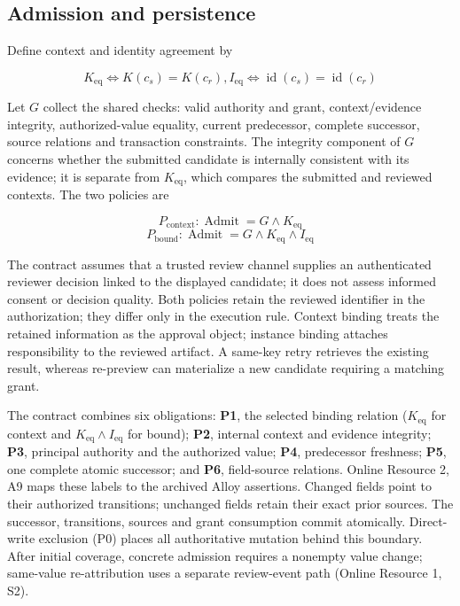 \documentclass[pdflatex,sn-basic]{sn-jnl}
\begin{document}
\subsection{Admission and persistence}\label{admission-and-persistence}

Define context and identity agreement by

\[
K_{\mathrm{eq}} \Leftrightarrow  K(c_s) = K(c_r),   I_{\mathrm{eq}} \Leftrightarrow  \operatorname{id}(c_s) = \operatorname{id}(c_r)
\]

Let \(G\) collect the shared checks: valid authority and grant, context/evidence integrity, authorized-value equality, current predecessor, complete successor, source relations and transaction constraints. The integrity component of \(G\) concerns whether the submitted candidate is internally consistent with its evidence; it is separate from \(K_{\mathrm{eq}}\), which compares the submitted and reviewed contexts. The two policies are

\[
P_{\mathrm{context}}: \operatorname{Admit} = G \land  K_{\mathrm{eq}}
\] \[
P_{\mathrm{bound}}:   \operatorname{Admit} = G \land  K_{\mathrm{eq}} \land  I_{\mathrm{eq}}
\]

The contract assumes that a trusted review channel supplies an authenticated reviewer decision linked to the displayed candidate; it does not assess informed consent or decision quality. Both policies retain the reviewed identifier in the authorization; they differ only in the execution rule. Context binding treats the retained information as the approval object; instance binding attaches responsibility to the reviewed artifact. A same-key retry retrieves the existing result, whereas re-preview can materialize a new candidate requiring a matching grant.

The contract combines six obligations: \textbf{P1}, the selected binding relation ($K_{\mathrm{eq}}$ for context and $K_{\mathrm{eq}}\land I_{\mathrm{eq}}$ for bound); \textbf{P2}, internal context and evidence integrity; \textbf{P3}, principal authority and the authorized value; \textbf{P4}, predecessor freshness; \textbf{P5}, one complete atomic successor; and \textbf{P6}, field-source relations. Online Resource 2, A9 maps these labels to the archived Alloy assertions. Changed fields point to their authorized transitions; unchanged fields retain their exact prior sources. The successor, transitions, sources and grant consumption commit atomically. Direct-write exclusion (P0) places all authoritative mutation behind this boundary. After initial coverage, concrete admission requires a nonempty value change; same-value re-attribution uses a separate review-event path (Online Resource 1, S2).
\end{document}
